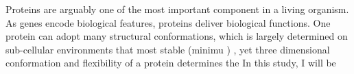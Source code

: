 Proteins are arguably one of the most important component in a living organism. As genes encode biological features, proteins deliver biological functions. One protein can adopt many structural conformations, which is largely determined on sub-cellular environments that most stable (minimu ) , yet three dimensional conformation and flexibility of a protein determines the     In this study, I will be 